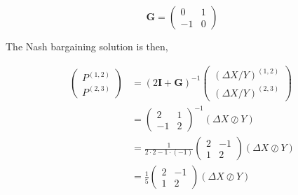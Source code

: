 \documentclass[american]{scrartcl}
\newcommand{\matr}[1]{\bm{#1}}
\begin{document}
\vspace{0.5cm}
\begin{minipage}{0.6\textwidth}
\end{minipage} \hfill
\begin{minipage}{0.35\textwidth}
	\begin{equation*}
		\matr{G} = \begin{pmatrix}
			0  & 1 \\
			-1 & 0
		\end{pmatrix}
	\end{equation*}
\end{minipage}
\vspace{0.5cm}


The Nash bargaining solution is then,

\begin{equation*}
	\begin{split}
		\begin{pmatrix}
			P^{(1, 2)} \\
			P^{(2, 3)}
		\end{pmatrix} &= (2\matr{I} + \matr{G})^{-1} \begin{pmatrix}
			(\Delta X / Y)^{(1, 2)} \\
			(\Delta X / Y)^{(2, 3)}
		\end{pmatrix} \\
		&= \begin{pmatrix}
			2  & 1 \\
			-1 & 2
		\end{pmatrix}^{-1} (\Delta X \oslash Y)\\
		&= \frac{1}{2 \cdot 2 - 1 \cdot (-1)} \begin{pmatrix}
			2 & - 1 \\
			1 & 2
		\end{pmatrix} (\Delta X \oslash Y) \\
		&= \frac{1}{5} \begin{pmatrix}
			2 & - 1 \\
			1 & 2
		\end{pmatrix} (\Delta X \oslash Y)
	\end{split}
\end{equation*}
\end{document}
